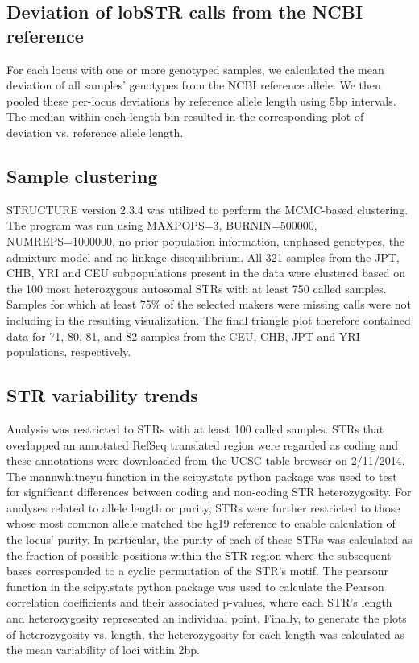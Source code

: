 \subsection{Deviation of lobSTR calls from the NCBI reference}
For each locus with one or more genotyped samples, we calculated the mean deviation of all samples' genotypes from the NCBI reference allele. We then pooled these per-locus deviations by reference allele length using 5bp intervals. The median within each length bin resulted in the corresponding plot of deviation vs. reference allele length. 

\subsection{Sample clustering}
STRUCTURE version 2.3.4 was utilized to perform the MCMC-based clustering. The program was run using MAXPOPS=3, BURNIN=500000, NUMREPS=1000000, no prior population information, unphased genotypes, the admixture model and no linkage disequilibrium. All 321 samples from the JPT, CHB, YRI and CEU subpopulations present in the data were clustered based on the 100 most heterozygous autosomal STRs with at least 750 called samples. Samples for which at least 75\% of the selected makers were missing calls were not including in the resulting visualization. The final triangle plot therefore contained data for 71, 80, 81, and 82 samples from the CEU, CHB, JPT and YRI populations, respectively.  

\subsection{STR variability trends}
Analysis was restricted to STRs with at least 100 called samples. STRs that overlapped an annotated RefSeq translated region were regarded as coding and these annotations were downloaded from the UCSC table browser on 2/11/2014.  The mannwhitneyu function in the scipy.stats python package was used to test for significant differences between coding and non-coding STR heterozygosity. For analyses related to allele length or purity, STRs were further restricted to those whose most common allele matched the hg19 reference to enable calculation of the locus' purity. In particular, the purity of each of these STRs was calculated as the fraction of possible positions within the STR region where the subsequent bases corresponded to a cyclic permutation of the STR's motif. The pearsonr function in the scipy.stats python package was used to calculate the Pearson correlation coefficients and their associated p-values, where each STR's length and heterozygosity represented an individual point. Finally, to generate the plots of heterozygosity vs. length, the heterozygosity for each length was calculated as the mean variability of loci within 2bp.   

